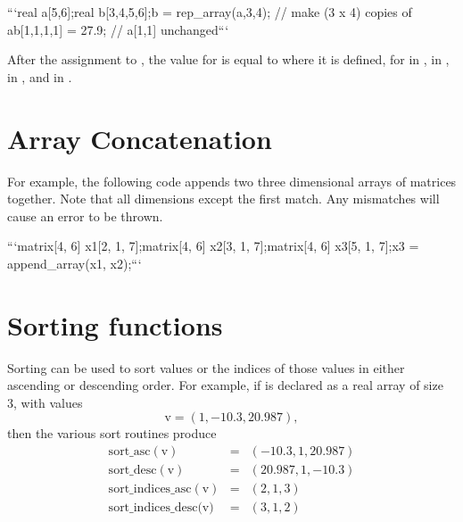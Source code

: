 \begin{description}
{```\n real a[5,6];\n real b[3,4,5,6];\n \n b = rep_array(a,3,4); //  make (3 x 4) copies of a\n b[1,1,1,1] = 27.9;    //  a[1,1] unchanged\n ```


After the assignment to , the value for  is equal to  where it is defined, for  in ,  in ,  in , and  in .


\section{Array Concatenation}\label{array-concatenation.section}


\begin{description}  \end{description}


For example, the following code appends two three dimensional arrays of matrices together. Note that all dimensions except the first match. Any mismatches will cause an error to be thrown.


```\n matrix[4, 6] x1[2, 1, 7];\n matrix[4, 6] x2[3, 1, 7];\n matrix[4, 6] x3[5, 1, 7];\n \n x3 = append_array(x1, x2);\n ```


\section{Sorting functions}\label{sorting-functions.section}


Sorting can be used to sort values or the indices of those values in either ascending or descending order.  For example, if  is declared as a real array of size 3, with values \[ \text{v} = (1, -10.3, 20.987), \] then the various sort routines produce  \begin{eqnarray*} \mathrm{sort\_asc(v)} & = &  (-10.3,1,20.987) \\[4pt] \mathrm{sort\_desc(v)} & = &  (20.987,1,-10.3) \\[4pt] \mathrm{sort\_indices\_asc(v)} & = &  (2,1,3) \\[4pt] \text{sort\_indices\_desc(v)} & = &  (3,1,2) \end{eqnarray*}


}
\end{description}
